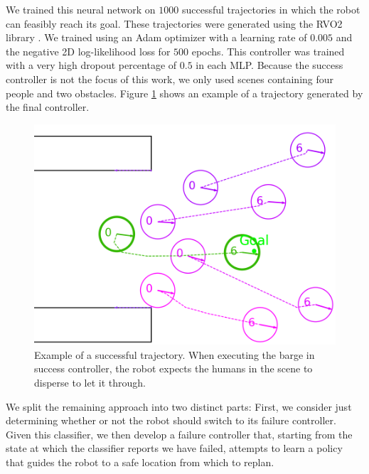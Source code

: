 \documentclass[letterpaper, 10 pt, conference]{ieeeconf}  %
\begin{document}
	We trained this neural network on $1000$ successful trajectories in which the robot can feasibly reach its goal. These trajectories were generated using the RVO2 library \cite{rvo2}\cite{pyrvo2}. We trained using an Adam optimizer with a learning rate of $0.005$ and the negative 2D log-likelihood loss for $500$ epochs. This controller was trained with a very high dropout percentage of $0.5$ in each MLP. Because the success controller is not the focus of this work, we only used scenes containing four people and two obstacles. Figure \ref{fig:success} shows an example of a trajectory generated by the final controller. 

	\begin{figure}
		\centering
		\includegraphics[width=\linewidth]{success_without_ellipses}
		\caption{Example of a successful trajectory. When executing the barge in success controller, the robot expects the humans in the scene to disperse to let it through.}
		\label{fig:success}
	\end{figure}
	
	We split the remaining approach into two distinct parts: First, we consider just determining whether or not the robot should switch to its failure controller. Given this classifier, we then develop a failure controller that, starting from the state at which the classifier reports we have failed, attempts to learn a policy that guides the robot to a safe location from which to replan.
	
\end{document}
